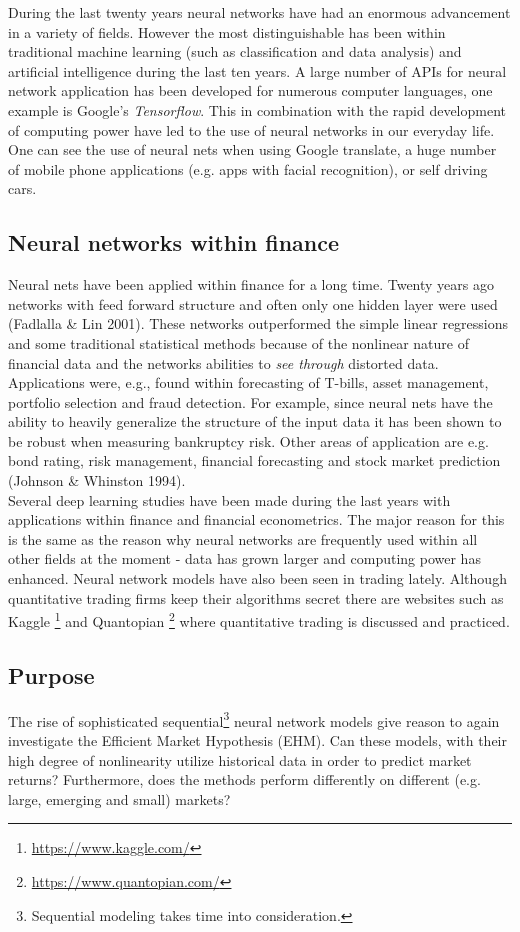 \documentclass[12pt, letterpaper]{amsart}%
\begin{document}
During the last twenty years neural networks have had an enormous advancement in a variety of fields. However the most distinguishable has been within traditional machine learning (such as classification and data analysis) and artificial intelligence during the last ten years. A large number of APIs for neural network application has been developed for numerous computer languages, one example is Google's \textit{Tensorflow}. This in combination with the rapid development of computing power have led to the use of neural networks in our everyday life. One can see the use of neural nets when using Google translate, a huge number of mobile phone applications (e.g. apps with facial recognition), or self driving cars.

\subsection{Neural networks within finance}
Neural nets have been applied within finance for a long time. Twenty years ago networks with feed forward structure and often only one hidden layer were used (Fadlalla \& Lin 2001). These networks outperformed the simple linear regressions and some traditional statistical methods because of the nonlinear nature of financial data and the networks abilities to \textit{see through} distorted data. Applications were, e.g., found within forecasting of T-bills, asset management, portfolio selection and fraud detection. For example, since neural nets have the ability to heavily generalize the structure of the input data it has been shown to be robust when measuring bankruptcy risk. Other areas of application are e.g. bond rating, risk management, financial forecasting and stock market prediction (Johnson \& Whinston 1994).
\\

Several deep learning studies have been made during the last years with applications within finance and financial econometrics. The major reason for this is the same as the reason why neural networks are frequently used within all other fields at the moment - data has grown larger and computing power has enhanced. Neural network models have also been seen in trading lately. Although quantitative trading firms keep their algorithms secret there are websites such as Kaggle \footnote{\url{https://www.kaggle.com/}} and Quantopian \footnote{\url{https://www.quantopian.com/}} where quantitative trading is discussed and practiced.

\subsection{Purpose}
The rise of sophisticated sequential\footnote{Sequential modeling takes time into consideration.} neural network models give reason to again investigate the Efficient Market Hypothesis (EHM). Can these models, with their high degree of nonlinearity utilize historical data in order to predict market returns? Furthermore, does the methods perform differently on different (e.g. large, emerging and small) markets?
\\
\end{document}
